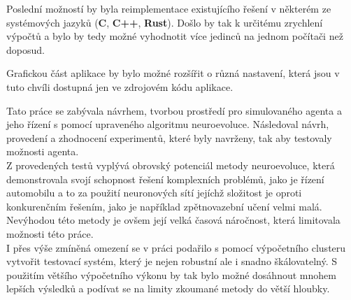 Poslední možností by byla reimplementace existujícího řešení v některém ze systémových jazyků (\textbf{C}, \textbf{C++}, \textbf{Rust}). Došlo by tak k určitému zrychlení výpočtů a bylo by tedy možné vyhodnotit více jedinců na jednom počítači než doposud. 

Grafickou část aplikace by bylo možné rozšířit o různá nastavení, která jsou v tuto chvíli dostupná jen ve zdrojovém kódu aplikace.

Tato práce se zabývala návrhem, tvorbou prostředí pro simulovaného agenta a jeho řízení s pomocí upraveného algoritmu neuroevoluce. Následoval návrh, provedení a zhodnocení experimentů, které byly navrženy, tak aby testovaly možnosti agenta.\\
Z provedených testů vyplývá obrovský potenciál metody neuroevoluce, která demonstrovala svojí schopnost řešení komplexních problémů, jako je řízení automobilu a to za použití neuronových sítí jejíchž složitost je oproti konkurenčním řešením, jako je například zpětnovazební učení velmi malá.\\
Nevýhodou této metody je ovšem její velká časová náročnost, která limitovala možnosti této práce.\\
I přes výše zmíněná omezení se v práci podařilo s pomocí výpočetního clusteru vytvořit testovací systém, který je nejen robustní ale i snadno škálovatelný. S použitím většího výpočetního výkonu by tak bylo možné dosáhnout mnohem lepších výsledků a podívat se na limity zkoumané metody do větší hloubky.